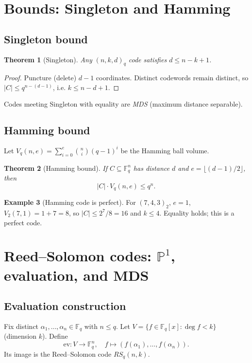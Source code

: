 \documentclass[11pt]{article}
\newtheorem{theorem}{Theorem}[section]
\theoremstyle{definition}
\newtheorem{example}[theorem]{Example}
\theoremstyle{remark}
\newcommand{\F}{\mathbb{F}}
\newcommand{\PP}{\mathbb{P}}
\newcommand{\ev}{\mathrm{ev}}
\begin{document}
	\section{Bounds: Singleton and Hamming}
	\subsection{Singleton bound}
	\begin{theorem}[Singleton]
		Any \((n,k,d)_q\) code satisfies \(d\le n-k+1\).
	\end{theorem}
	
	\begin{proof}
		Puncture (delete) \(d-1\) coordinates. Distinct codewords remain distinct, so
		\(|C|\le q^{n-(d-1)}\), i.e. \(k\le n-d+1\).
	\end{proof}
	
	Codes meeting Singleton with equality are \emph{MDS} (maximum distance separable).
	
	\subsection{Hamming bound}
	Let \(V_q(n,e)=\sum_{i=0}^e \binom{n}{i}(q-1)^i\) be the Hamming ball volume.
	
	\begin{theorem}[Hamming bound]
		If \(C\subseteq \F_q^n\) has distance \(d\) and \(e=\lfloor(d-1)/2\rfloor\), then
		\[
		|C|\cdot V_q(n,e)\le q^n.
		\]
	\end{theorem}
	
	\begin{example}[Hamming code is perfect]
		For \((7,4,3)_2\), \(e=1\), \(V_2(7,1)=1+7=8\), so
		\(|C|\le 2^7/8=16\) and \(k\le 4\). Equality holds; this is a perfect code.
	\end{example}
	
	\section{Reed--Solomon codes: \(\PP^1\), evaluation, and MDS}
	\subsection{Evaluation construction}
	Fix distinct \(\alpha_1,\dots,\alpha_n\in \F_q\) with \(n\le q\).
	Let \(V=\{f\in \F_q[x]:\deg f<k\}\) (dimension \(k\)).
	Define
	\[
	\ev:V\to \F_q^n,\quad f\mapsto (f(\alpha_1),\dots,f(\alpha_n)).
	\]
	Its image is the Reed--Solomon code \(RS_{q}(n,k)\).
	
\end{document}
